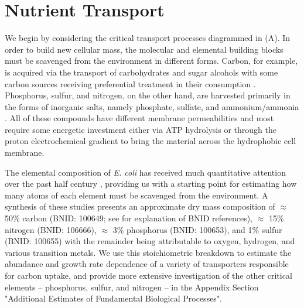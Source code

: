 \section{Nutrient Transport}
We begin by considering the critical transport processes diagrammed in
(A). In order to build new cellular mass, the molecular and
elemental building blocks must be scavenged from the environment in different
forms. Carbon, for example, is acquired via the transport of carbohydrates
and sugar alcohols with some carbon sources receiving preferential treatment
in their consumption \citep{monod1947}. Phosphorus, sulfur, and nitrogen, on
the other hand, are harvested primarily in the forms of inorganic salts,
namely phosphate, sulfate, and ammonium/ammonia \citep{jun2018,
assentoft2016, stasi2019, antonenko1997, rosenberg1977, willsky1973}. All of
these compounds have different membrane permeabilities \citep{phillips2018}
and most require some energetic investment either via ATP hydrolysis or
through the proton electrochemical gradient to bring the material across the
hydrophobic cell membrane.

The elemental composition of \textit{E. coli} has received much quantitative
attention over the past half century \citep{neidhardt1991,
taymaz-nikerel2010, heldal1985, bauer1976}, providing us with a starting
point for estimating how many atoms of each element must be scavenged from
the environment. A synthesis of these studies presents an approximate dry
mass composition of $\approx$ 50\% carbon (BNID: 100649; see
 for explanation of BNID references), $\approx$ 15\%
nitrogen (BNID: 106666), $\approx$ 3\% phosphorus (BNID: 100653), and 1\%
sulfur (BNID: 100655) with the remainder being attributable to oxygen,
hydrogen, and various transition metals. We use this stoichiometric breakdown
to estimate the abundance and growth rate dependence of a variety of
transporters responsible for carbon uptake, and provide more extensive
investigation of the other critical elements -- phosphorus, sulfur, and
nitrogen -- in the Appendix Section "Additional Estimates of Fundamental Biological Processes".

